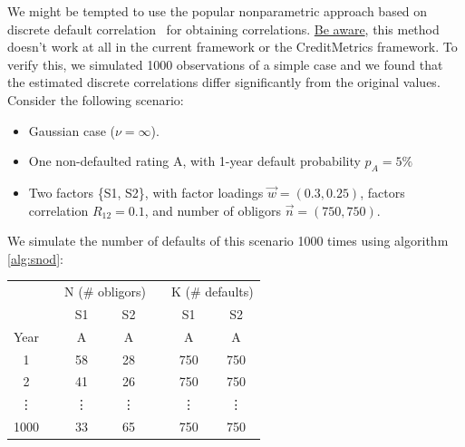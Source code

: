 \documentclass[11pt,fleqn]{book} %
\begin{document}
We might be tempted to use the popular nonparametric approach based on discrete 
default correlation~\cite{lucas:1995,nagpal:2001} for obtaining correlations.
\underline{Be aware}, this method doesn't work at all in the current framework
or the CreditMetrics\texttrademark{} framework. 
To verify this, we simulated 1000 observations of a simple case and we found 
that the estimated discrete correlations differ significantly from the original 
values. Consider the following scenario:
\begin{itemize}
	\item Gaussian case ($\nu = \infty$).
	\item One non-defaulted rating A, with 1-year default probability $p_A=5\%$
	\item Two factors \{S1, S2\}, with factor loadings $\vec{w} = (0.3, 0.25)$, 
	factors correlation $R_{12} = 0.1$, and number of obligors $\vec{n} = (750, 750)$.
\end{itemize}
We simulate the number of defaults of this scenario 1000 times using algorithm 
\ref{alg:snod}:

\hspace*{1cm}
\begin{tabular}{cc|c||c|  c  |c||c|}
	\cline{3-4} \cline{6-7}
	& & \multicolumn{2}{|c|}{N (\# obligors)} & & \multicolumn{2}{|c|}{K (\# defaults)} \\
	\cline{3-4} \cline{6-7}
	& & \multicolumn{1}{|c||}{S1} & \multicolumn{1}{|c|}{S2} & & \multicolumn{1}{|c||}{S1} & \multicolumn{1}{|c|}{S2} \\
	\cline{1-1} \cline{3-4} \cline{6-7}
	\multicolumn{1}{|c|}{Year} & & A & A & & A & A \\
	\cline{1-1} \cline{3-4} \cline{6-7}
	\multicolumn{1}{|c|}{1} & & 58 & 28 & & 750 & 750 \\
	\cline{1-1} \cline{3-4} \cline{6-7}
	\multicolumn{1}{|c|}{2} & & 41 & 26 & & 750 & 750 \\
	\cline{1-1} \cline{3-4} \cline{6-7}
	\multicolumn{1}{|c|}{\vdots} & & \vdots & \vdots & & \vdots & \vdots \\
	\cline{1-1} \cline{3-4} \cline{6-7}
	\multicolumn{1}{|c|}{1000} & & 33 & 65 & & 750 & 750 \\
	\cline{1-1} \cline{3-4} \cline{6-7}
\end{tabular}
\end{document}
